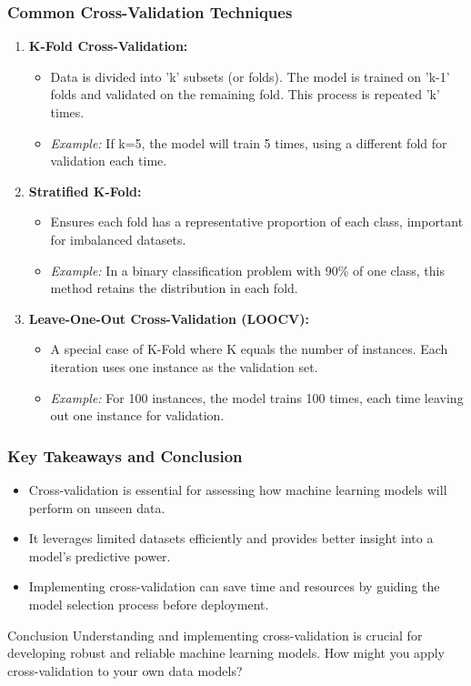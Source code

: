 \documentclass[aspectratio=169]{beamer}
\begin{document}
\begin{frame}[fragile]
    \frametitle{Common Cross-Validation Techniques}
    \begin{enumerate}
        \item \textbf{K-Fold Cross-Validation:}
        \begin{itemize}
            \item Data is divided into 'k' subsets (or folds). The model is trained on 'k-1' folds and validated on the remaining fold. This process is repeated 'k' times.
            \item \textit{Example:} If k=5, the model will train 5 times, using a different fold for validation each time.
        \end{itemize}
        
        \item \textbf{Stratified K-Fold:}
        \begin{itemize}
            \item Ensures each fold has a representative proportion of each class, important for imbalanced datasets.
            \item \textit{Example:} In a binary classification problem with 90\% of one class, this method retains the distribution in each fold.
        \end{itemize}
        
        \item \textbf{Leave-One-Out Cross-Validation (LOOCV):}
        \begin{itemize}
            \item A special case of K-Fold where K equals the number of instances. Each iteration uses one instance as the validation set.
            \item \textit{Example:} For 100 instances, the model trains 100 times, each time leaving out one instance for validation.
        \end{itemize}
    \end{enumerate}
\end{frame}

\begin{frame}[fragile]
    \frametitle{Key Takeaways and Conclusion}
    \begin{itemize}
        \item Cross-validation is essential for assessing how machine learning models will perform on unseen data.
        \item It leverages limited datasets efficiently and provides better insight into a model's predictive power.
        \item Implementing cross-validation can save time and resources by guiding the model selection process before deployment.
    \end{itemize}
    
    \begin{block}{Conclusion}
        Understanding and implementing cross-validation is crucial for developing robust and reliable machine learning models. How might you apply cross-validation to your own data models?
    \end{block}
\end{frame}
\end{document}
